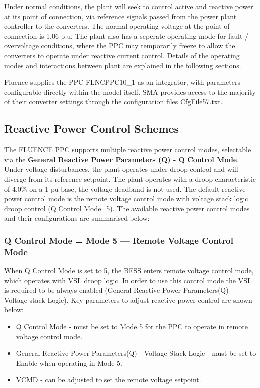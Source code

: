 \documentclass{../grid-link-report}
\begin{document}
	 	Under normal conditions, the plant will seek to control active and reactive power at its point of connection, via reference signals passed from the power plant controller to the converters. The normal operating voltage at the point of connection is 1.06 p.u. The plant also has a seperate operating mode for fault / overvoltage conditions, where the PPC may temporarily freeze to allow the converters to operate under reactive current control. Details of the operating modes and interactions between plant are explained in the following sections.
	 
	 	Fluence supplies the PPC FLNCPPC10_1 as an integrator, with parameters configurable directly within the model itself. SMA provides access to the majority of their converter settings through the configuration files CfgFile57.txt. 
	
	\subsection{Reactive Power Control Schemes}
		The FLUENCE PPC supports multiple reactive power control modes, selectable via the \textbf{General Reactive Power Parameters (Q) - Q Control Mode}. Under voltage disturbances, the plant operates under droop control and will diverge from its reference setpoint. The plant operates with a droop characteristic of 4.0\% on a 1 pu base, the voltage deadband is not used. The default reactive power control mode is the remote voltage control mode with voltage stack logic droop control (Q Control Mode=5). The available reactive power control modes and their configurations are summarised below:
		
		\subsubsection{Q Control Mode = Mode 5 — Remote Voltage Control Mode}
		
		When Q Control Mode is set to 5, the BESS enters remote voltage control mode, which operates with \ac{VSL} droop logic. In order to use this control mode the VSL is required to be always enabled (General Reactive Power Parameters(Q) - Voltage stack Logic). Key parameters to adjust reactive power control are shown below:
		
		\begin{itemize}
			\item Q Control Mode - must be set to Mode 5 for the PPC to operate in remote voltage control mode.
			\item General Reactive Power Parameters(Q) - Voltage Stack Logic - must be set to Enable when operating in Mode 5.
			\item VCMD - can be adjusted to set the remote voltage setpoint.
		\end{itemize}
		
\end{document}
